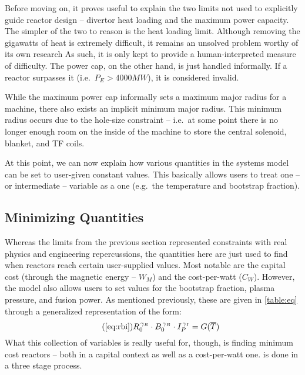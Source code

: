 Before moving on, it proves useful to explain the two limits not used to explicitly guide reactor design -- divertor heat loading and the maximum power capacity. The simpler of the two to reason is the heat loading limit. Although removing the gigawatts of heat is extremely difficult, it remains an unsolved problem worthy of its own research  As such, it is only kept to provide a human-interpreted  measure of difficulty. The power cap, on the other hand, is just handled informally. If a reactor surpasses it (i.e.\ $ P_E > 4000 MW $), it is considered invalid.

While the maximum power cap informally sets a maximum major radius for a machine, there also exists an implicit minimum major radius. This minimum radius occurs due to the hole-size constraint -- i.e.\ at some point there is no longer enough room on the inside of the machine to store the central solenoid, blanket, and TF coils.

At this point, we can now explain how various quantities in the systems model can be set to user-given constant values. This basically allows users to treat one  -- or intermediate -- variable as a  one (e.g.\ the temperature and bootstrap fraction).

\subsection{Minimizing  Quantities}

Whereas the limits from the previous section represented constraints with real physics and engineering repercussions, the  quantities here are just used to find when reactors reach certain user-supplied values. Most notable are the capital cost (through the magnetic energy -- $W_M$) and the cost-per-watt ($C_W$). However, the model also allows users to set values for the bootstrap fraction, plasma pressure, and fusion power. As mentioned previously, these are given in \cref{table:eq} through a generalized representation of the form:
\begin{equation}
	\tag{\ref{eq:rbi}}
	R_0^{\, \gamma_R} \cdot B_0^{\, \gamma_B} \cdot I_P^{\, \gamma_I} = G( \overline T )
\end{equation}
What this collection of variables is really useful for, though, is finding minimum cost reactors -- both in a capital context as well as a cost-per-watt one.  is done in a three stage process. 

